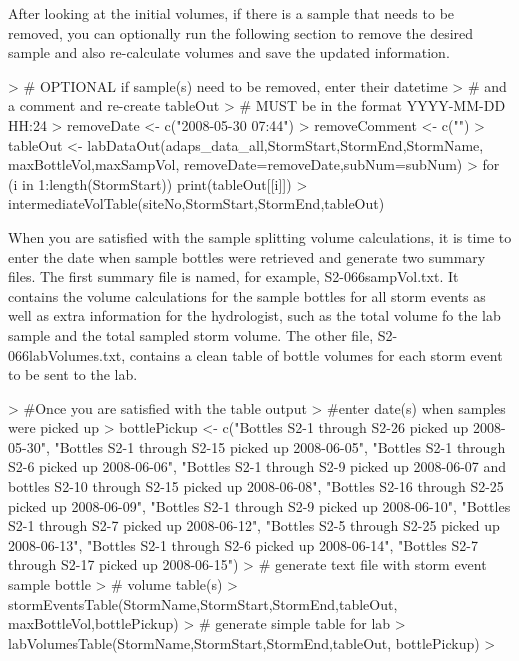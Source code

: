 \documentclass[a4paper,11pt]{article}
\begin{document}
After looking at the initial volumes, if there is a sample that needs to be removed, you can optionally run the following section to remove the desired sample and also re-calculate volumes and save the updated information.

\begin{Schunk}
\begin{Sinput}
> # OPTIONAL if sample(s) need to be removed, enter their datetime  
> # and a comment and re-create tableOut
> # MUST be in the format YYYY-MM-DD HH:24
> removeDate <- c("2008-05-30 07:44")
> removeComment <- c("")
> tableOut <- labDataOut(adaps_data_all,StormStart,StormEnd,StormName,
                        maxBottleVol,maxSampVol,
                        removeDate=removeDate,subNum=subNum)
> for (i in 1:length(StormStart)){
   print(tableOut[[i]])
 }
> intermediateVolTable(siteNo,StormStart,StormEnd,tableOut)
\end{Sinput}
\end{Schunk}

When you are satisfied with the sample splitting volume calculations, it is time to enter the date when sample bottles were retrieved and generate two summary files. The first summary file is named, for example, S2-066sampVol.txt. It contains the volume calculations for the sample bottles for all storm events as well as extra information for the hydrologist, such as the total volume fo the lab sample and the total sampled storm volume. The other file, S2-066labVolumes.txt, contains a clean table of bottle volumes for each storm event to be sent to the lab.

\begin{Schunk}
\begin{Sinput}
> #Once you are satisfied with the table output
> #enter date(s) when samples were picked up 
> bottlePickup <- c("Bottles S2-1 through S2-26 picked up 2008-05-30",
                   "Bottles S2-1 through S2-15 picked up 2008-06-05",
                   "Bottles S2-1 through S2-6 picked up 2008-06-06",
                   "Bottles S2-1 through S2-9 picked up 2008-06-07 and 
                   bottles S2-10 through S2-15 picked up 2008-06-08",
                   "Bottles S2-16 through S2-25 picked up 2008-06-09",
                   "Bottles S2-1 through S2-9 picked up 2008-06-10",
                   "Bottles S2-1 through S2-7 picked up 2008-06-12",
                   "Bottles S2-5 through S2-25 picked up 2008-06-13",
                   "Bottles S2-1 through S2-6 picked up 2008-06-14",
                   "Bottles S2-7 through S2-17 picked up 2008-06-15")
> # generate text file with storm event sample bottle 
> # volume table(s)
> stormEventsTable(StormName,StormStart,StormEnd,tableOut,
                  maxBottleVol,bottlePickup)
> # generate simple table for lab
> labVolumesTable(StormName,StormStart,StormEnd,tableOut,
                 bottlePickup)
> 
\end{Sinput}
\end{Schunk}
\end{document}

